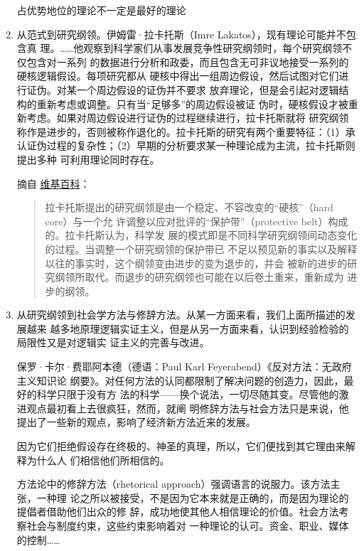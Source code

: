 \begin{enumerate}
  占优势地位的理论不一定是最好的理论


\item 从范式到研究纲领。伊姆雷·拉卡托斯（Imre Lakatos），现有理论可能并不包含真
  理。……他观察到科学家们从事发展竞争性研究纲领时，每个研究纲领不仅包含对一系列
  的数据进行分析和政委，而且包含无可非议地接受一系列的硬核逻辑假设。每项研究都从
  硬核中得出一组周边假设，然后试图对它们进行证伪。对某一个周边假设的证伪并不要求
  放弃理论，但是会引起对逻辑结构的重新考虑或调整。只有当“足够多”的周边假设被证
  伪时，硬核假设才被重新考虑。如果对周边假设进行证伪的过程继续进行，拉卡托斯就将
  研究纲领称作是进步的，否则被称作退化的。拉卡托斯的研究有两个重要特征：（1）承
  认证伪过程的复杂性；（2）早期的分析要求某一种理论成为主流，拉卡托斯则提出多种
  可利用理论同时存在。

  摘自
  \href{https://zh.wikipedia.org/wiki/%E7%A0%94%E7%A9%B6%E7%BA%B2%E9%A2%86}{维基百科}：
    \begin{quotation}
      拉卡托斯提出的研究纲领是由一个稳定、不容改变的“硬核”（hard core）与一个允
      许调整以应对批评的“保护带”（protective belt）构成的。拉卡托斯认为，科学发
      展的模式即是不同科学研究纲领间动态变化的过程。当调整一个研究纲领的保护带已
      不足以预见新的事实以及解释以往的事实时，这个纲领变由进步的变为退步的，并会
      被新的进步的研究纲领所取代。而退步的研究纲领也可能在以后卷土重来，重新成为
      进步的纲领。
    \end{quotation}

\item 从研究纲领到社会学方法与修辞方法。从某一方面来看，我们上面所描述的发展越来
  越多地原理逻辑实证主义，但是从另一方面来看，认识到经验检验的局限性又是对逻辑实
  证主义的完善与改进。

  保罗·卡尔·费耶阿本德（德语：Paul Karl Feyerabend）《反对方法：无政府主义知识论
  纲要》。对任何方法的认同都限制了解决问题的创造力，因此，最好的科学只限于没有方
  法的科学——换个说法，一切尽随其变。尽管他的激进观点最初看上去很疯狂，然而，就阐
  明修辞方法与社会方法只是来说，他提出了一些新的观点，影响了经济新方法近来的发展。

  因为它们拒绝假设存在终极的、神圣的真理，所以，它们便找到其它理由来解释为什么人
  们相信他们所相信的。

  方法论中的修辞方法（rhetorical approach）强调语言的说服力。该方法主张，一种理
  论之所以被接受，不是因为它本来就是正确的，而是因为理论的提倡者借助他们出众的修
  辞，成功地使其他人相信理论的价值。社会方法考察社会与制度约束，这些约束影响着对
  一种理论的认可。资金、职业、媒体的控制……


\end{enumerate}
